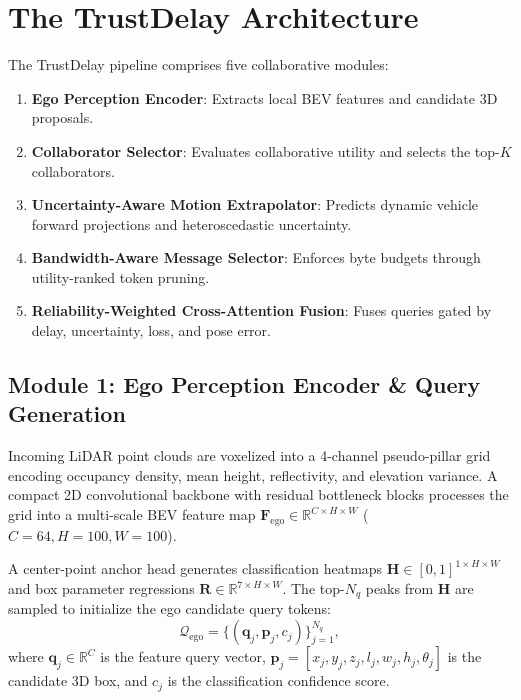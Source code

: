 \documentclass[10pt,journal,compsoc]{IEEEtran}
\begin{document}
\section{The TrustDelay Architecture}

The TrustDelay pipeline comprises five collaborative modules:
\begin{enumerate}
    \item \textbf{Ego Perception Encoder}: Extracts local BEV features and candidate 3D proposals.
    \item \textbf{Collaborator Selector}: Evaluates collaborative utility and selects the top-$K$ collaborators.
    \item \textbf{Uncertainty-Aware Motion Extrapolator}: Predicts dynamic vehicle forward projections and heteroscedastic uncertainty.
    \item \textbf{Bandwidth-Aware Message Selector}: Enforces byte budgets through utility-ranked token pruning.
    \item \textbf{Reliability-Weighted Cross-Attention Fusion}: Fuses queries gated by delay, uncertainty, loss, and pose error.
\end{enumerate}

\subsection{Module 1: Ego Perception Encoder \& Query Generation}
Incoming LiDAR point clouds are voxelized into a 4-channel pseudo-pillar grid encoding occupancy density, mean height, reflectivity, and elevation variance. A compact 2D convolutional backbone with residual bottleneck blocks processes the grid into a multi-scale BEV feature map $\mathbf{F}_{\text{ego}} \in \mathbb{R}^{C \times H \times W}$ ($C=64, H=100, W=100$).

A center-point anchor head generates classification heatmaps $\mathbf{H} \in [0, 1]^{1 \times H \times W}$ and box parameter regressions $\mathbf{R} \in \mathbb{R}^{7 \times H \times W}$. The top-$N_q$ peaks from $\mathbf{H}$ are sampled to initialize the ego candidate query tokens:
\begin{equation}
\mathcal{Q}_{\text{ego}} = \{(\mathbf{q}_j, \mathbf{p}_j, c_j)\}_{j=1}^{N_q},
\end{equation}
where $\mathbf{q}_j \in \mathbb{R}^C$ is the feature query vector, $\mathbf{p}_j = [x_j, y_j, z_j, l_j, w_j, h_j, \theta_j]$ is the candidate 3D box, and $c_j$ is the classification confidence score.
\end{document}
